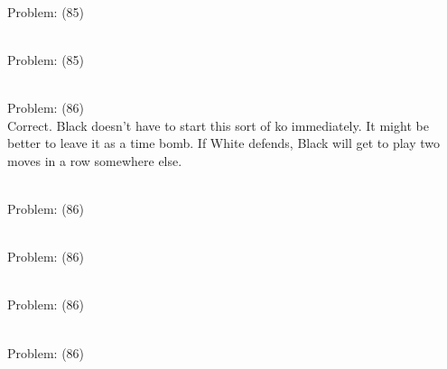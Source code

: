 \documentclass[11pt]{article}
\begin{document}
\begin{minipage}[t]{0.5\textwidth}
  {\centering
  
\\
Problem: (85)\\
  }
\end{minipage}
\begin{minipage}[t]{0.5\textwidth}
  {\centering
  
\\
Problem: (85)\\
  }
\end{minipage}
\begin{minipage}[t]{0.5\textwidth}
  {\centering
  
\\
Problem: (86)\\
Correct. Black doesn't have to start this sort of ko immediately. It might be better to leave it as a time bomb. If White defends, Black will get to play two moves in a row somewhere else.\\
  }
\end{minipage}
\begin{minipage}[t]{0.5\textwidth}
  {\centering
  
\\
Problem: (86)\\
  }
\end{minipage}
\begin{minipage}[t]{0.5\textwidth}
  {\centering
  
\\
Problem: (86)\\
  }
\end{minipage}
\begin{minipage}[t]{0.5\textwidth}
  {\centering
  
\\
Problem: (86)\\
  }
\end{minipage}
\begin{minipage}[t]{0.5\textwidth}
  {\centering
  
\\
Problem: (86)\\
  }
\end{minipage}
\end{document}

